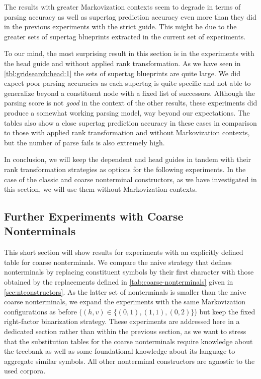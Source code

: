 \documentclass[../../document.tex]{subfiles}
\begin{document}
    The results with greater Markovization contexts seem to degrade in terms of parsing accuracy as well as supertag prediction accuracy even more than they did in the previous experiments with the strict guide.
    This might be due to the greater sets of supertag blueprints extracted in the current set of experiments.

    To our mind, the most surprising result in this section is in the experiments with the head guide and without applied rank transformation.
    As we have seen in \cref{tbl:gridsearch:head:1} the sets of supertag blueprints are quite large.
    We did expect poor parsing accuracies as each supertag is quite specific and not able to generalize beyond a constituent node with a fixed list of successors.
    Although the parsing score is not \emph{good} in the context of the other results, these experiments did produce a somewhat working parsing model, way beyond our expectations.
    The tables also show a close supertag prediction accuracy in these cases in comparison to those with applied rank transformation and without Markovization contexts, but the number of parse fails is also extremely high.

    In conclusion, we will keep the dependent and head guides in tandem with their rank transformation strategies as options for the following experiments.
    In the case of the classic and coarse nonterminal constructors, as we have investigated in this section, we will use them without Markovization contexts.

    \subsection{Further Experiments with Coarse Nonterminals}\label{sec:gridsearch:coarse}
    This short section will show results for experiments with an explicitly defined table for coarse nonterminals.
    We compare the naive strategy that defines nonterminals by replacing constituent symbols by their first character with those obtained by the replacements defined in \cref{tab:coarse-nonterminals} given in \cref{sec:ntconstructors}.
    As the latter set of nonterminals is smaller than the naive coarse nonterminals, we expand the experiments with the same Markovization configurations as before ($(h,v) \in \{(0,1), (1,1), (0,2)\}$) but keep the fixed right-factor binarization strategy.
    These experiments are addressed here in a dedicated section rather than within the previous section, as we want to stress that the substitution tables for the coarse nonterminals require knowledge about the treebank as well as some foundational knowledge about its language to aggregate similar symbols.
    All other nonterminal constructors are agnostic to the used corpora.
\end{document}
